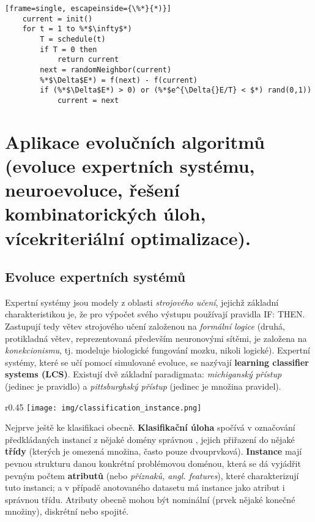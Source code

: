 \begin{minipage}{\linewidth}
\begin{lstlisting}[frame=single, escapeinside={\%*}{*)}]
	current = init()
	for t = 1 to %*$\infty$*)
		T = schedule(t)
		if T = 0 then 
			return current
		next = randomNeighbor(current)
		%*$\Delta$E*) = f(next) - f(current)
		if (%*$\Delta$E*) > 0) or (%*$e^{\Delta{}E/T} < $*) rand(0,1))
			current = next
\end{lstlisting}
\end{minipage}






\section{Aplikace evolučních algoritmů (evoluce expertních systému, neuroevoluce, řešení kombinatorických úloh, vícekriteriální optimalizace).}
\subsection{Evoluce expertních systémů}
Expertní systémy jsou modely z oblasti \textit{strojového učení}, jejichž základní charakteristikou je, že pro výpočet svého výstupu používají pravidla IF: THEN. Zastupují tedy větev strojového učení založenou na \textit{formální logice} (druhá, protikladná větev, reprezentovaná především neuronovými sítěmi, je založena na \textit{konekcionismu}, tj. modeluje biologické fungování mozku, nikoli logické). Expertní systémy, které se učí pomocí simulované evoluce, se nazývají \textbf{learning classifier systems (LCS)}. Existují dvě základní paradigmata: \textit{michiganský přístup} (jedinec je pravidlo) a \textit{pittsburghský přístup} (jedinec je množina pravidel).

\begin{wrapfigure}{r}{0.45\textwidth}
\centering
\texttt{[image: img/classification\_instance.png]}
\end{wrapfigure}
Nejprve ještě ke klasifikaci obecně. \textbf{Klasifikační úloha} spočívá v označování předkládaných instancí z nějaké domény správnou , jejich přiřazení do nějaké \textbf{třídy} (kterých je omezená množina, často pouze dvouprvková). \textbf{Instance} mají pevnou strukturu danou konkrétní problémovou doménou, která se dá vyjádřit pevným počtem \textbf{atributů} (nebo \textit{příznaků, angl. features}), které charakterizují tuto instanci; a v případě anotovaného datasetu má instance jako atribut i správnou třídu. Atributy obecně mohou být nominální (prvek nějaké konečné množiny), diskrétní nebo spojité.


